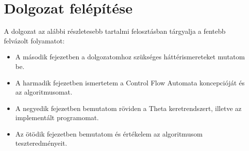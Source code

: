 \section{Dolgozat felépítése}

A dolgozat az alábbi részletesebb tartalmi felosztásban tárgyalja a fentebb felvázolt folyamatot:
\begin{itemize}
	\item A második fejezetben a dolgozatomhoz szükséges háttérismereteket mutatom be.
	\item A harmadik fejezetben ismertetem a Control Flow Automata koncepcióját és az algoritmusomat.
	\item A negyedik fejezetben bemutatom röviden a Theta keretrendszert, illetve az implementált programomat.
	\item Az ötödik fejezetben bemutatom és értékelem az algoritmusom teszteredményeit.
\end{itemize}